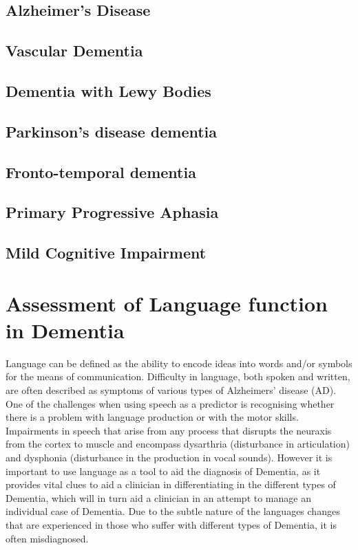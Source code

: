 \documentclass[a4paper]{article}
\begin{document}
\subsection{Alzheimer's Disease}
\subsection{Vascular Dementia}
\subsection{Dementia with Lewy Bodies}
\subsection{Parkinson's disease dementia}
\subsection{Fronto-temporal dementia}
\subsection{Primary Progressive Aphasia}
\subsection{Mild Cognitive Impairment}

\section{Assessment of Language function in Dementia}

Language can be defined as the ability to encode ideas into words and/or symbols for the means of communication. Difficulty in language, both spoken and written, are often described as symptoms of various types of Alzheimers' disease (AD). One of the challenges when using speech as a predictor is recognising whether there is a problem with language production or with the motor skills. Impairments in speech that arise from any process that disrupts the neuraxis from the cortex to muscle and encompass dysarthria (disturbance in articulation) and dysphonia (disturbance in the production in vocal sounds). However it is important to use language as a tool to aid the diagnosis of Dementia, as it provides vital clues to aid a clinician in differentiating in the different types of Dementia, which will in turn aid a clinician in an attempt to manage an individual case of Dementia. Due to the subtle nature of the languages changes that are experienced in those who suffer with different types of Dementia, it is often misdiagnosed.
\end{document}
